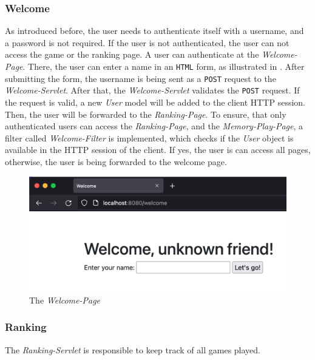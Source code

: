 \subsubsection{Welcome}\label{subsubsec:03_impl_backend_welcome}
As introduced before, the user needs to authenticate itself with a username, and a password is not required. If the user is not authenticated, the user can not access the game or the ranking page.
A user can authenticate at the \textit{Welcome-Page}. There, the user can enter a name in an \texttt{HTML} form, as illustrated in . After submitting the form, the username is being sent as a \texttt{POST} request to the \textit{Welcome-Servlet}. After that, the \textit{Welcome-Servlet} validates the \texttt{POST} request. If the request is valid, a new \textit{User} model will be added to the client HTTP session. Then, the user will be forwarded to the \textit{Ranking-Page}.
To ensure, that only authenticated users can access the \textit{Ranking-Page}, and the \textit{Memory-Play-Page}, a filter called \textit{Welcome-Filter} is implemented, which checks if the \textit{User} object is available in the HTTP session of the client. If yes, the user is can access all pages, otherwise, the user is being forwarded to the welcome page.
\begin{figure}[h]
\centering
\includegraphics[scale=0.4]{images/03_impl/welcome/welcome-page}
\caption{The \textit{Welcome-Page}}
\label{fig:03_impl_backend_welcome_page}
\end{figure}

\subsubsection{Ranking}\label{subsubsec:03_impl_backend_ranking}
The \textit{Ranking-Servlet} is responsible to keep track of all games played.

